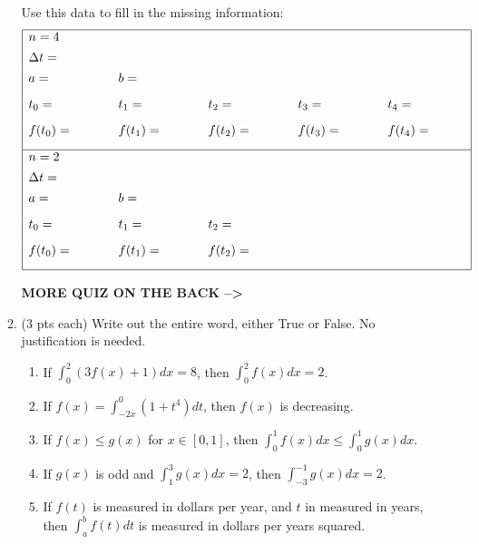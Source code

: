 \documentclass[11pt,letterpaper]{article}
\begin{document}
\begin{enumerate}
\begin{enumerate}
Use this data to fill in the missing information:
\[\begin{array}{| l l l l l |}
\hline
n=4 & & & & \\ [1ex]
\Delta t=\hspace{1 cm} & & & & \\ [1ex]
a=\hspace{1 cm} & b=\hspace{1 cm} & & &\\ [2ex]
t_0=\hspace{1 cm} & t_1=\hspace{1 cm} & t_2=\hspace{1 cm} & t_3=\hspace{1 cm} & t_4=\hspace{1 cm} \\ [2ex]
f(t_0)=\hspace{1 cm} & f(t_1)=\hspace{1 cm} & f(t_2)=\hspace{1 cm} & f(t_3)=\hspace{1 cm} & f(t_4)=\hspace{1 cm} \\ [2ex]
\hline
 n=2 & & & & \\ [1ex]
\Delta t=\hspace{1 cm} & & & & \\ [1ex]
a=\hspace{1 cm} & b=\hspace{1 cm} & & &\\ [2ex]
t_0=\hspace{1 cm} & t_1=\hspace{1 cm} & t_2=\hspace{1 cm} &  &  \\ [2ex]
f(t_0)=\hspace{1 cm} & f(t_1)=\hspace{1 cm} & f(t_2)=\hspace{1 cm} &  &  \\ [2ex]
\hline
\end{array}\]

\hfill{\bf MORE QUIZ ON THE BACK --\textgreater}
\vfill

\item (3 pts each) Write out the entire word, either True or False.  No justification is needed.
\begin{enumerate}
\item If $\int_0^2(3f(x)+1)dx=8$, then $\int_0^2f(x)dx=2$.
\vfill
\item If $f(x)=\int_{-2x}^0(1+t^4)dt$, then $f(x)$ is decreasing.
\vfill
\item If $f(x)\leq g(x)$ for $x\in[0,1]$, then $\int_0^1f(x)dx\leq\int_0^1g(x)dx$.
\vfill
\item If $g(x)$ is odd and $\int_1^3g(x)dx=2$, then $\int_{-3}^{-1}g(x)dx=2$.
\vfill
\item If $f(t)$ is measured in dollars per year, and $t$ in measured in years, then $\int_a^bf(t)dt$ is measured in dollars per years squared.
\vfill
\end{enumerate}


\end{enumerate}
\end{enumerate}
\end{document}
